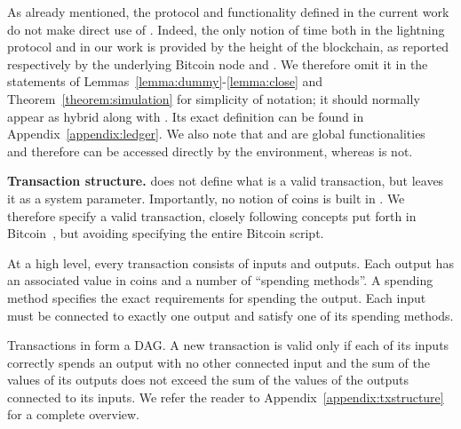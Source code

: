     As already mentioned, the protocol and functionality defined in the current
    work do not make direct use of \Fclock. Indeed, the only notion of time both
    in the lightning protocol and in our work is provided by the height of the
    blockchain, as reported respectively by the underlying Bitcoin node and
    \ledger. We therefore omit it in the statements of
    Lemmas~\ref{lemma:dummy}-\ref{lemma:close} and
    Theorem~\ref{theorem:simulation} for simplicity of notation; it should
    normally appear as hybrid along with \ledger. Its exact definition can be
    found in Appendix~\ref{appendix:ledger}. We also note that \ledger{} and
    \Fclock are global functionalities~\cite{globaluc} and therefore can be
    accessed directly by the environment, whereas \fpaynet{} is not.

  \noindent \textbf{Transaction structure.}
    \ledger{} does not define what is a valid transaction, but leaves it as a
    system parameter. Importantly, no notion of coins is built in \ledger. We
    therefore specify a valid transaction, closely following concepts put forth
    in Bitcoin~\cite{bitcoin}, but avoiding specifying the entire Bitcoin
    script.

    At a high level, every transaction consists of inputs and outputs. Each
    output has an associated value in coins and a number of ``spending
    methods''. A spending method specifies the exact requirements for spending
    the output. Each input must be connected to exactly one output and satisfy
    one of its spending methods.

    Transactions in \ledger{} form a DAG. A new transaction is valid only if
    each of its inputs correctly spends an output with no other connected input
    and the sum of the values of its outputs does not exceed the sum of the
    values of the outputs connected to its inputs. We refer the reader to
    Appendix~\ref{appendix:txstructure} for a complete overview.


